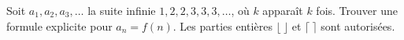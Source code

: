Soit $a_1, a_2, a_3, \ldots$ la suite infinie $1, 2, 2, 3, 3, 3, \ldots$, où $k$ apparaît $k$ fois. Trouver une formule explicite pour $a_n = f(n)$. Les parties entières $\lfloor\ \rfloor$ et $\lceil\ \rceil$ sont autorisées.
